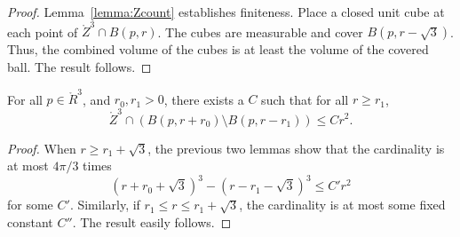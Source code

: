 \begin{proof}  Lemma~\ref{lemma:Zcount} establishes finiteness.  Place a closed unit cube at each point
of $\ring{Z}^3\cap B(p,r)$.  The cubes are measurable and cover
$B(p,r-\sqrt3)$.  Thus, the combined volume of the cubes is at
least the volume of the covered ball.  The result follows.
\end{proof}

\begin{lemma}
For all $p\in\ring{R}^3$, and $r_0,r_1>0$, there exists a $C$ such
that for all $r\ge r_1$, 
    $$
    \ring{Z}^3 \cap (B(p,r+r_0) \setminus B(p,r-r_1)) \le C r^2.
    $$
\end{lemma}

\begin{proof}  When $r \ge r_1+\sqrt3$, the previous two lemmas show
that the cardinality is at most $4\pi/3$ times
    $$(r +r_0 + \sqrt3)^3 - (r - r_1 - \sqrt3)^3 \le C' r^2$$
for some $C'$.  Similarly, if $r_1\le r\le r_1+\sqrt3$, the
cardinality is at most some fixed constant $C''$.  The result
easily follows.
\end{proof}

